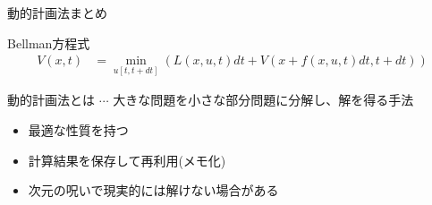 \documentclass[dvipdfmx,12pt]{beamer}
\begin{document}
    \begin{frame}{動的計画法まとめ}
        \scriptsize

        \begin{block}{Bellman方程式}
            \begin{align*}
                V(x, t) &= \min_{u[t, t+dt]} \left( L(x, u, t) dt + V \left( x + f(x, u, t) dt, t + dt \right) \right)
            \end{align*}
        \end{block}

        動的計画法とは $\cdots$ 大きな問題を小さな部分問題に分解し、解を得る手法

        \begin{itemize}
            \item 最適な性質を持つ
            \item 計算結果を保存して再利用(メモ化)
            \item 次元の呪いで現実的には解けない場合がある
        \end{itemize}
    \end{frame}
\end{document}
